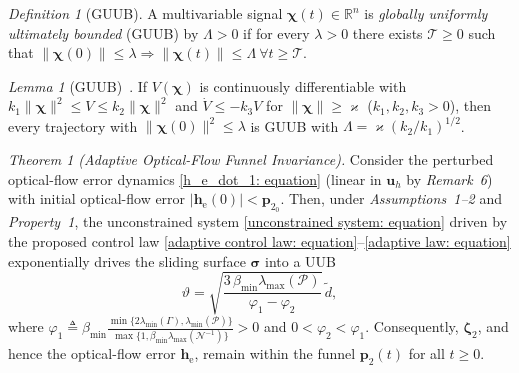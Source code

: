 \documentclass{IEEEtaes}
\begin{document}
\textit{Definition 1} (GUUB). A multivariable signal $\boldsymbol{\chi}(t)\in\mathbb{R}^n$ is \emph{globally uniformly ultimately bounded} (GUUB) by $\Lambda>0$ if for every $\lambda>0$ there exists $\mathcal{T}\ge 0$ such that $\|\boldsymbol{\chi}(0)\|\le\lambda\Rightarrow\|\boldsymbol{\chi}(t)\|\le\Lambda\ \forall t\ge\mathcal{T}$.

\textit{Lemma 1} (GUUB)~\cite{khalil2002}. If $V(\boldsymbol{\chi})$ is continuously differentiable with $k_1\|\boldsymbol{\chi}\|^2\le V\le k_2\|\boldsymbol{\chi}\|^2$ and $\dot{V}\le -k_3 V$ for $\|\boldsymbol{\chi}\|\ge\varkappa$ ($k_1,k_2,k_3>0$), then every trajectory with $\|\boldsymbol{\chi}(0)\|^2\le\lambda$ is GUUB with $\Lambda = \varkappa(k_2/k_1)^{1/2}$.

\textit{Theorem 1 (Adaptive Optical-Flow Funnel Invariance).}
Consider the perturbed optical-flow error dynamics \eqref{h_e_dot_1: equation} (linear in $\boldsymbol{u}_h$ by \textit{Remark~6}) with initial optical-flow error $|\boldsymbol{h}_\text{e}(0)|<\boldsymbol{p}_{2_0}$. Then, under \textit{Assumptions~1--2} and \textit{Property~1}, the unconstrained system \eqref{unconstrained system: equation} driven by the proposed control law \eqref{adaptive control law: equation}--\eqref{adaptive law: equation} exponentially drives the sliding surface $\boldsymbol{\sigma}$ into a UUB
\begin{equation} \label{UUB bound: equation}
    \vartheta = \sqrt{\frac{3\,\beta_{\min}\lambda_{\max}(\mathcal{P})}{\varphi_1-\varphi_2}}\,\tilde{d},
\end{equation}
where $\varphi_1 \triangleq \beta_{\min}\frac{\min\{2\lambda_{\min}(\Gamma),\lambda_{\min}(\mathcal{P})\}}{\max\{1,\beta_{\min}\lambda_{\max}(\mathcal{N}^{-1})\}}>0$ and $0<\varphi_2<\varphi_1$. Consequently, $\boldsymbol{\zeta}_2$, and hence the optical-flow error $\boldsymbol{h}_\text{e}$, remain within the funnel $\boldsymbol{p}_2(t)$ for all $t\ge 0$.
\end{document}
